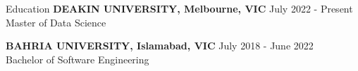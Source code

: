 \documentclass{resume} %
\begin{document}
\begin{rSection}{Education}
                        \textbf{DEAKIN UNIVERSITY, Melbourne, VIC} \hfill {July 2022 - Present} \\
                            {Master of Data Science}
                         
             
         
                        \textbf{BAHRIA UNIVERSITY, Islamabad, VIC} \hfill {July 2018 - June 2022} \\
                            {Bachelor of Software Engineering}
                         
             
         
    \end{rSection}

\end{document}
